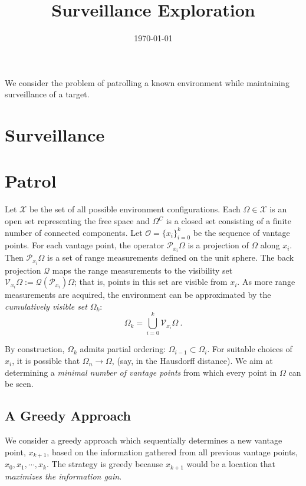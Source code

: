 \documentclass[11pt,english]{article}
\title{Surveillance Exploration}
\author{}
\date{\today}
\begin{document}
\maketitle

\newcommand{\proj}{\mathcal{P}}
\newcommand{\backproj}{\mathcal{Q}}



We consider the problem of patrolling a known environment while maintaining surveillance
of a target.




\section{Surveillance}

\section{Patrol}


Let $\mathcal{X}$ be the set of all possible environment configurations.
Each $\Omega \in \mathcal{X}$ is an open set representing the free space
and $\Omega^C$ is a closed set consisting of a finite number of connected components.
Let $\mathcal{O} = \{x_i\}_{i=0}^k$ be the sequence of vantage points. For
each vantage point, the operator $\proj_{x_i}\Omega$ is a projection of
$\Omega$ along $x_i$. Then $\proj_{x_i}\Omega$ is a set of range measurements defined
on the unit sphere.  The back projection $\backproj$ maps the range
measurements to the visibility set
$\mathcal{V}_{x_i} \Omega := \backproj (\proj_{x_i}) \Omega$;
that is, points in this set are visible from $x_i$.
As more range measurements are acquired, the
environment can be approximated by the \emph{cumulatively visible set} $\Omega_k$:
$$\Omega_k = \bigcup_{i=0}^k \mathcal{V}_{x_i}\Omega \ . $$

By construction, $\Omega_k$ admits partial ordering: $\Omega_{i-1} \subset \Omega_{i}$.
For suitable choices of $x_i$, it is possible that $\Omega_n \to \Omega$,
(say, in the Hausdorff distance).  We aim at determining a \emph{minimal number
of  vantage points}  from which every point in $\Omega$ can be seen.


\subsection{A Greedy Approach}
We consider a greedy approach which sequentially determines a new vantage point, $x_{k+1}$, based on the information gathered from all previous vantage points, $x_0,x_1,\cdots, x_{k}$.
The strategy is greedy because $x_{k+1}$ would be a location that \emph{maximizes the information gain}.
\end{document}
